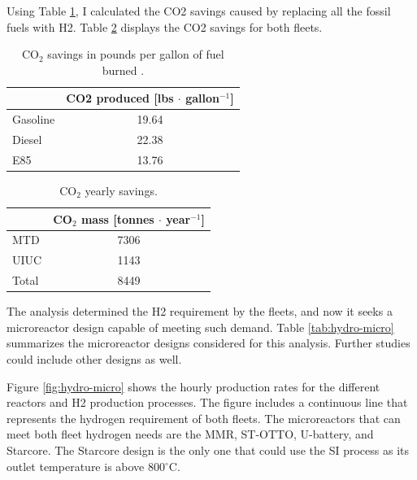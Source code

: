 Using Table \ref{tab:co2-eq}, I calculated the \gls{CO2} savings caused by replacing all the fossil fuels with \gls{H2}.
Table \ref{tab:co2} displays the \gls{CO2} savings for both fleets.

	\begin{table}[htbp!]
		\centering
	    \caption{CO$_2$ savings in pounds per gallon of fuel burned \cite{energy_information_administration_how_2014}.}
		\begin{tabular}{lc}
		\toprule
		              & \gls{CO2} produced [lbs $\cdot$ gallon$^{-1}$] \\
        \midrule
		Gasoline      & 19.64           \\
		Diesel        & 22.38           \\
		E85           & 13.76           \\
		\bottomrule
        \end{tabular}
        \label{tab:co2-eq}
	\end{table}

	\begin{table}[htbp!]
		\centering
	    \caption{CO$_2$ yearly savings.}
		\begin{tabular}{lc}
		\toprule
		            & CO$_2$ mass [tonnes $\cdot$ year$^{-1}$] \\
		\midrule
		MTD      	& 7306           \\
		UIUC        & 1143           \\
		Total       & 8449           \\
		\bottomrule
        \end{tabular}
        \label{tab:co2}
	\end{table}

The analysis determined the \gls{H2} requirement by the fleets, and now it seeks a microreactor design capable of meeting such demand.
Table \ref{tab:hydro-micro} summarizes the microreactor designs considered for this analysis.
Further studies could include other designs as well.

Figure \ref{fig:hydro-micro} shows the hourly production rates for the different reactors and \gls{H2} production processes.
The figure includes a continuous line that represents the hydrogen requirement of both fleets.
The microreactors that can meet both fleet hydrogen needs are the MMR, ST-OTTO, U-battery, and Starcore.
The Starcore design is the only one that could use the \gls{SI} process as its outlet temperature is above 800$^{\circ}$C.

